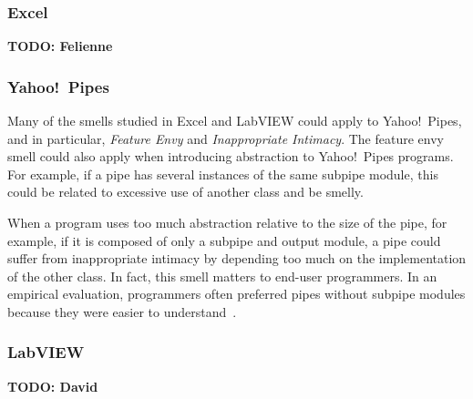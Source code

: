 \documentclass[10pt,conference,compsocconf]{IEEEtran}
\newcommand{\todo}[1]{\textbf{TODO: #1}}
\begin{document}
\subsubsection{Excel} \todo{Felienne}
\subsubsection{Yahoo!\ Pipes}
Many of the smells studied in Excel and LabVIEW could apply to Yahoo!\ Pipes, and in particular, \emph{Feature Envy} and \emph{Inappropriate Intimacy}. 
The feature envy smell could also apply when introducing abstraction to Yahoo!\ Pipes programs. For example, if a pipe has several instances of the same subpipe module, this could be related to excessive use of another class and be smelly. 

When a program uses too much abstraction relative to the size of the pipe, for example, if it is composed of only a subpipe and output module, a pipe could suffer from inappropriate intimacy by depending too much on the implementation of the other class. In fact, this smell matters to end-user programmers.  In an empirical evaluation, programmers often preferred pipes without subpipe modules because they were easier to understand~\cite{StoleeTSE2013}. 



\subsubsection{LabVIEW} \todo{David}
\end{document}
